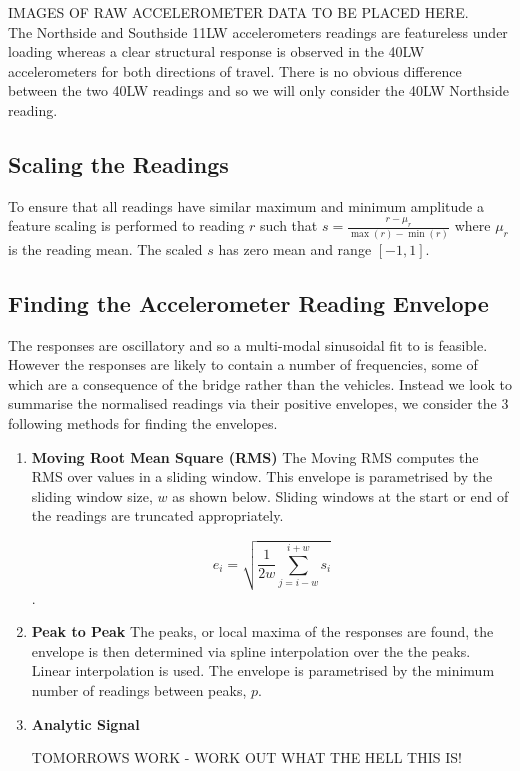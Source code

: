 \documentclass[a4paper,11pt,twocolumn]{article}
\begin{document}
IMAGES OF RAW ACCELEROMETER DATA TO BE PLACED HERE. \\

The Northside and Southside 11LW accelerometers readings are featureless under loading whereas a clear structural response is observed in the 40LW accelerometers for both directions of travel. There is no obvious difference between the two 40LW readings and so we will only consider the 40LW Northside reading.

\subsection{Scaling the Readings}
To ensure that all readings have similar maximum and minimum amplitude a feature scaling is performed to reading $r$ such that $s = \frac{r - \mu_r}{\max(r) - \min(r)}$ where $\mu_r$ is the reading mean. The scaled $s$ has zero mean and range $\left[-1,1\right]$.

\subsection{Finding the Accelerometer Reading Envelope}
The responses are oscillatory and so a multi-modal sinusoidal fit to is feasible. However the responses are likely to contain a number of frequencies, some of which are a consequence of the bridge rather than the vehicles. Instead we look to summarise the normalised readings via their positive envelopes, we consider the 3 following methods for finding the envelopes.

\begin{enumerate}
\item \textbf{Moving Root Mean Square (RMS)}
The Moving RMS computes the RMS over values in a sliding window. This envelope is parametrised by the sliding window size, $w$ as shown below. Sliding windows at the start or end of the readings are truncated appropriately. 

$$e_i = \sqrt{\frac{1}{2w}\sum_{j=i-w}^{i+w}s_i} $$. 

\item \textbf{Peak to Peak}
The peaks, or local maxima of the responses are found, the envelope is then determined via spline interpolation over the the peaks. Linear interpolation is used. The envelope is parametrised by the minimum number of readings between peaks, $p$.

\item \textbf{Analytic Signal}

TOMORROWS WORK - WORK OUT WHAT THE HELL THIS IS!

\end{enumerate}
\end{document}
